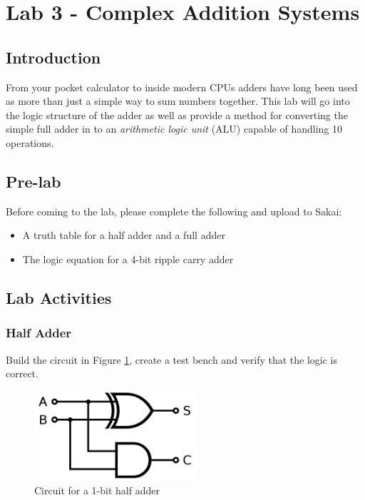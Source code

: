 \section{Lab 3 - Complex Addition Systems}

\subsection{Introduction}
From your pocket calculator to inside modern CPUs adders have long been used as more than just a simple way to sum numbers together. This lab will go into the logic structure of the adder as well as provide a method for converting the simple full adder in to an \emph{arithmetic logic unit} (ALU) capable of handling 10 operations.

\subsection{Pre-lab}
Before coming to the lab, please complete the following and upload to Sakai:
\begin{itemize}
	\item A truth table for a half adder and a full adder
	\item The logic equation for a 4-bit ripple carry adder
\end{itemize}

\subsection{Lab Activities}

\subsubsection{Half Adder}
Build the circuit in Figure \ref{fig:halfadder}, create a test bench and verify that the logic is correct.

\begin{figure}[H]
	\centering
	\includegraphics[width=60mm]{Lab3/figures/halfadder.png}
	\caption{Circuit for a 1-bit half adder}
	\label{fig:halfadder}
\end{figure}

